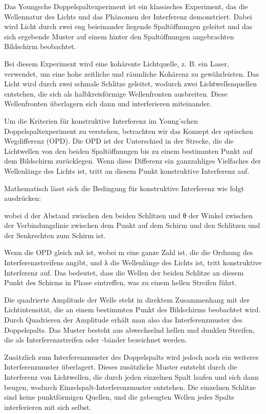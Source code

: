\documentclass[12pt,english,ngerman]{scrartcl}
\begin{document}

Das Youngsche Doppelspaltexperiment ist ein klassisches Experiment, das die
Wellennatur des Lichts und das Phänomen der Interferenz demonstriert. Dabei
wird Licht durch zwei eng beieinander liegende Spaltöffnungen geleitet und das
sich ergebende Muster auf einem hinter den Spaltöffnungen angebrachten
Bildschirm beobachtet.

Bei diesem Experiment wird eine kohärente Lichtquelle, z. B. ein Laser,
verwendet, um eine hohe zeitliche und räumliche Kohärenz zu gewährleisten. Das
Licht wird durch zwei schmale Schlitze geleitet, wodurch zwei
Lichtwellenquellen entstehen, die sich als halbkreisförmige Wellenfronten
ausbreiten. Diese Wellenfronten überlagern sich dann und interferieren
miteinander.

Um die Kriterien für konstruktive Interferenz im Young'schen
Doppelspaltexperiment zu verstehen, betrachten wir das Konzept der optischen
Wegdifferenz (OPD). Die OPD ist der Unterschied in der Strecke, die die
Lichtwellen von den beiden Spaltöffnungen bis zu einem bestimmten Punkt auf dem
Bildschirm zurücklegen. Wenn diese Differenz ein ganzzahliges Vielfaches der
Wellenlänge des Lichts ist, tritt an diesem Punkt konstruktive Interferenz auf.

Mathematisch lässt sich die Bedingung für konstruktive Interferenz wie folgt
ausdrücken:


wobei d der Abstand zwischen den beiden Schlitzen und θ der Winkel zwischen der
Verbindungslinie zwischen dem Punkt auf dem Schirm und den Schlitzen und der
Senkrechten zum Schirm ist.

Wenn die OPD gleich mλ ist, wobei m eine ganze Zahl ist, die die Ordnung des
Interferenzstreifens angibt, und λ die Wellenlänge des Lichts ist, tritt
konstruktive Interferenz auf. Das bedeutet, dass die Wellen der beiden Schlitze
an diesem Punkt des Schirms in Phase eintreffen, was zu einem hellen Streifen
führt.

Die quadrierte Amplitude der Welle steht in direktem Zusammenhang mit der
Lichtintensität, die an einem bestimmten Punkt des Bildschirms beobachtet wird.
Durch Quadrieren der Amplitude erhält man also das Interferenzmuster des
Doppelspalts. Das Muster besteht aus abwechselnd hellen und dunklen Streifen,
die als Interferenzstreifen oder -bänder bezeichnet werden.


Zusätzlich zum Interferenzmuster des Doppelspalts wird jedoch noch ein weiteres
Interferenzmuster überlagert. Dieses zusätzliche Muster entsteht durch die
Interferenz von Lichtwellen, die durch jeden einzelnen Spalt laufen und sich
dann beugen, wodurch Einzelspalt-Interferenzmuster entstehen. Die einzelnen
Schlitze sind keine punktförmigen Quellen, und die gebeugten Wellen jedes
Spalts interferieren mit sich selbst.
\end{document}
